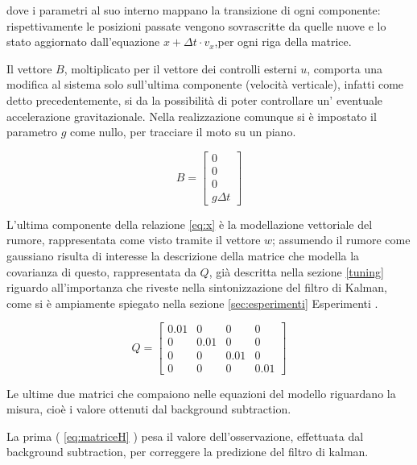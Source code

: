 dove i parametri al suo interno mappano la transizione di ogni componente: rispettivamente le posizioni passate vengono sovrascritte da quelle nuove e lo stato aggiornato dall'equazione $x + \Delta t \cdot v_x$,per ogni riga della matrice.

Il vettore $B$, moltiplicato per il vettore dei controlli esterni $u$, comporta una modifica al sistema solo sull'ultima componente (velocità verticale), infatti come detto precedentemente, si da la possibilità di poter controllare un' eventuale accelerazione gravitazionale. Nella realizzazione comunque si è impostato il parametro $g$ come nullo, per tracciare il moto su un piano.

\begin{equation}
 B =\begin{bmatrix} 0 \\ 0 \\ 0 \\ g \Delta t \end{bmatrix}\end{equation} 

L'ultima componente della relazione \ref{eq:x} è la modellazione vettoriale del rumore, rappresentata come visto tramite il vettore $w$; assumendo il rumore come gaussiano risulta di interesse la descrizione della matrice che modella la covarianza di questo, rappresentata da $Q$, già descritta nella sezione \ref{tuning} riguardo all'importanza che riveste nella sintonizzazione del filtro di Kalman, come si è ampiamente spiegato nella sezione \ref{sec:esperimenti} Esperimenti .

 
\begin{equation}
Q = \begin{bmatrix} 
0.01 & 0 & 0 & 0\\
0 & 0.01 & 0 & 0\\
0 & 0 & 0.01 & 0\\
0 & 0 & 0 & 0.01
\end{bmatrix}\end{equation} 




Le ultime due matrici che compaiono nelle equazioni del modello riguardano la misura, cioè i valore ottenuti dal background subtraction. 

La prima ( \ref{eq:matriceH} ) pesa il valore dell'osservazione, effettuata dal background subtraction, per correggere la predizione del filtro di kalman.

